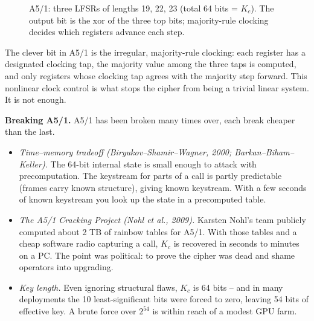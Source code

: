 \begin{figure}[H]
\centering
{}
\caption{A5/1: three LFSRs of lengths 19, 22, 23 (total 64 bits = $K_c$). The output bit is the xor of the three top bits; majority-rule clocking decides which registers advance each step.}
\label{ch29:fig-a51}
\end{figure}

The clever bit in A5/1 is the irregular, majority-rule clocking: each register has a designated clocking tap, the majority value among the three taps is computed, and only registers whose clocking tap agrees with the majority step forward. This nonlinear clock control is what stops the cipher from being a trivial linear system. It is not enough.

\begin{attackbox}
\textbf{Breaking A5/1.} A5/1 has been broken many times over, each break cheaper than the last.
\begin{itemize}
  \item \emph{Time--memory tradeoff (Biryukov--Shamir--Wagner, 2000; Barkan--Biham--Keller).} The 64-bit internal state is small enough to attack with precomputation. The keystream for parts of a call is partly predictable (frames carry known structure), giving known keystream. With a few seconds of known keystream you look up the state in a precomputed table.
  \item \emph{The A5/1 Cracking Project (Nohl et al., 2009).} Karsten Nohl's team publicly computed about 2 TB of rainbow tables for A5/1. With those tables and a cheap software radio capturing a call, $K_c$ is recovered in seconds to minutes on a PC. The point was political: to prove the cipher was dead and shame operators into upgrading.
  \item \emph{Key length.} Even ignoring structural flaws, $K_c$ is 64 bits -- and in many deployments the 10 least-significant bits were forced to zero, leaving 54 bits of effective key. A brute force over $2^{54}$ is within reach of a modest GPU farm.
\end{itemize}
\end{attackbox}

